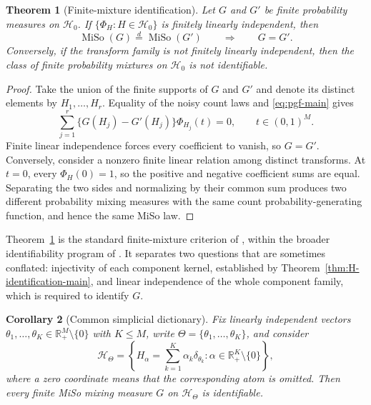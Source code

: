\documentclass[11pt]{article}
\newcommand{\R}{\mathbb{R}}
\newcommand{\MiSo}{\operatorname{MiSo}}
\theoremstyle{plain}
\newtheorem{theorem}{Theorem}
\newtheorem{corollary}[theorem]{Corollary}
\theoremstyle{definition}
\begin{document}
\begin{theorem}[Finite-mixture identification]
\label{thm:G-identification-main}
Let $G$ and $G'$ be finite probability measures on $\mathcal H_0$.  If
$\{\Phi_H:H\in\mathcal H_0\}$ is finitely linearly independent, then
\[
  \MiSo(G)\overset{d}{=}\MiSo(G')
  \qquad\Longrightarrow\qquad
  G=G'.
\]
Conversely, if the transform family is not finitely linearly independent,
then the class of finite probability mixtures on $\mathcal H_0$ is not
identifiable.
\end{theorem}

\begin{proof}
Take the union of the finite supports of $G$ and $G'$ and denote its distinct
elements by $H_1,\ldots,H_r$.  Equality of the noisy count laws and
\eqref{eq:pgf-main} gives
\[
  \sum_{j=1}^{r}\{G(H_j)-G'(H_j)\}\Phi_{H_j}(t)=0,
  \qquad t\in(0,1)^M.
\]
Finite linear independence forces every coefficient to vanish, so $G=G'$.
Conversely, consider a nonzero finite linear relation among distinct
transforms.  At $t=0$, every $\Phi_H(0)=1$, so the positive and negative
coefficient sums are equal.  Separating the two sides and normalizing by
their common sum produces two different probability mixing measures with
the same count probability-generating function, and hence the same MiSo law.
\end{proof}

Theorem~\ref{thm:G-identification-main} is the standard finite-mixture
criterion of \citet{YakowitzSpragins1968}, within the broader identifiability
program of \citet{Teicher1960,Teicher1963}.  It separates two questions that
are sometimes conflated: injectivity of each component kernel, established by
Theorem~\ref{thm:H-identification-main}, and linear independence of the whole
component family, which is required to identify $G$.

\begin{corollary}[Common simplicial dictionary]
\label{cor:dictionary-main}
Fix linearly independent vectors
$\theta_1,\ldots,\theta_K\in\R_+^M\setminus\{0\}$ with $K\leq M$, write
$\Theta=\{\theta_1,\ldots,\theta_K\}$, and consider
\begin{equation}
  \mathcal H_\Theta
  =\left\{
    H_\alpha=\sum_{k=1}^{K}\alpha_k\delta_{\theta_k}:
    \alpha\in\R_+^K\setminus\{0\}
  \right\},
  \label{eq:H-theta-main}
\end{equation}
where a zero coordinate means that the corresponding atom is omitted.  Then
every finite MiSo mixing measure $G$ on $\mathcal H_\Theta$ is identifiable.
\end{corollary}
\end{document}
